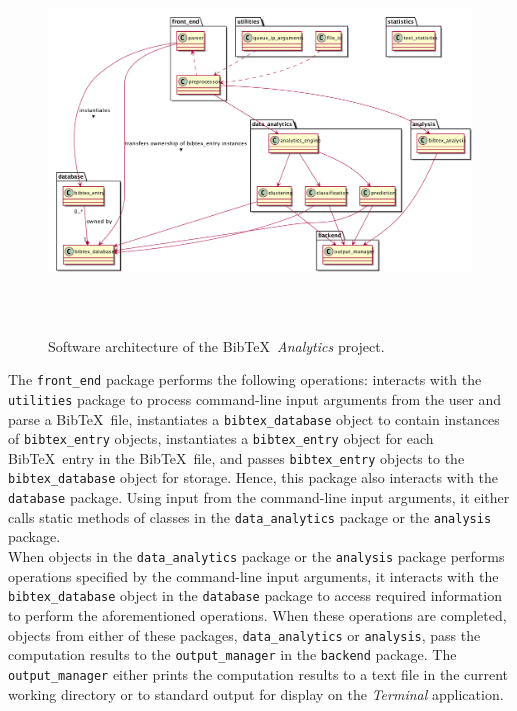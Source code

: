 \begin{figure}[h]
\centering 
\includegraphics[height=4in]{pics/sw-arch/sw-arch}
\caption{Software architecture of the {\sc Bib}\TeX\ {\it Analytics} project.}
\label{fig:SoftwareArchitecture}
\end{figure}

The {\tt front\_end} package performs the following operations: interacts with the {\tt utilities} package to process command-line input arguments from the user and parse a {\sc Bib}\TeX\ file, instantiates a {\tt bibtex\_database} object to contain instances of {\tt bibtex\_entry} objects, instantiates a {\tt bibtex\_entry} object for each {\sc Bib}\TeX\ entry in the {\sc Bib}\TeX\ file, and passes {\tt bibtex\_entry} objects to the {\tt bibtex\_database} object for storage. Hence, this package also interacts with the {\tt database} package. Using input from the command-line input arguments, it either calls static methods of classes in the {\tt data\_analytics} package or the {\tt analysis} package. \\

When objects in the {\tt data\_analytics} package or the {\tt analysis} package performs operations specified by the command-line input arguments, it interacts with the {\tt bibtex\_database} object in the {\tt database} package to access required information to perform the aforementioned operations. When these operations are completed, objects from either of these packages, {\tt data\_analytics} or {\tt analysis}, pass the computation results to the {\tt output\_manager} in the {\tt backend} package. The {\tt output\_manager} either prints the computation results to a text file in the current working directory or to standard output for display on the {\it Terminal} application. \\


